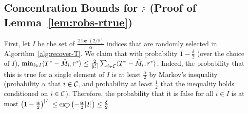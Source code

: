 \subsection{Concentration Bounds for $\tilde{r}$ (Proof of Lemma~\ref{lem:robs-rtrue})}
\label{sec:concentration-proof}

First, let $I$ be the set of $\frac{2\log(2/\delta)}{\alpha}$ 
indices that are randomly selected in Algorithm~\ref{alg:recover-T}. 
We claim that with probability $1-\frac{\delta}{2}$ (over the choice of $I$), 
$\min_{i \in I} \langle T^* - \tilde{M}_i, r^* \rangle \leq \frac{2}{|\mathcal{C}|} \sum_{i \in \mathcal{C}} \langle T^* - \tilde{M}_i, r^* \rangle$.
Indeed, the probability that this is true for a single element of 
$I$ is at least $\frac{\alpha}{2}$ by Markov's inequality (probability $\alpha$ that $i \in \mathcal{C}$, 
and probability at least $\frac{1}{2}$ that the inequality holds conditioned on $i \in \mathcal{C}$). 
Therefore, the probability that it is false for all $i \in I$ is at most 
$\left( 1 - \frac{\alpha}{2} \right)^{|I|} \leq \exp\left( -\frac{\alpha}{2}|I| \right) \leq \frac{\delta}{2}$.

